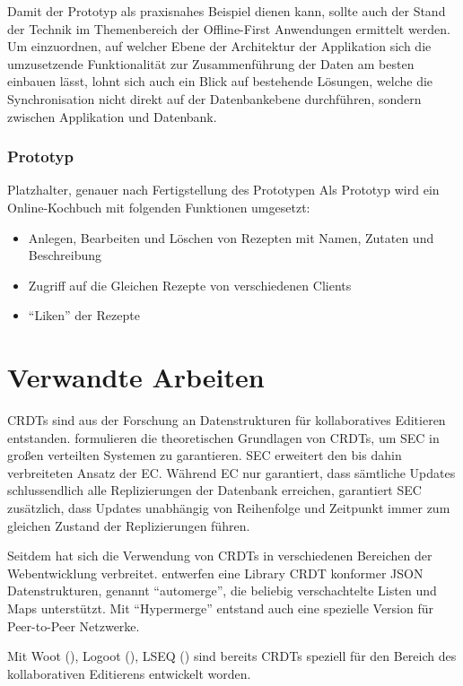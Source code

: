 \documentclass[a4paper, 12pt]{scrreprt}
\newcommand\klammercite[1]{%
	(\citealt{#1})}
\begin{document}
Damit der Prototyp als praxisnahes Beispiel dienen kann, sollte auch der Stand der Technik im Themenbereich der Offline-First Anwendungen ermittelt werden. Um einzuordnen, auf welcher Ebene der Architektur der Applikation sich die umzusetzende Funktionalität zur Zusammenführung der Daten am besten einbauen lässt, lohnt sich auch ein Blick auf bestehende Lösungen, welche die Synchronisation nicht direkt auf der Datenbankebene durchführen, sondern zwischen Applikation und Datenbank.

\subsection{Prototyp}
Platzhalter, genauer nach Fertigstellung des Prototypen
Als Prototyp wird ein Online-Kochbuch mit folgenden Funktionen umgesetzt:
\begin{itemize}
	\item Anlegen, Bearbeiten und Löschen von Rezepten mit Namen, Zutaten und Beschreibung
	\item Zugriff auf die Gleichen Rezepte von verschiedenen Clients
	\item \enquote{Liken} der Rezepte
\end{itemize}

\chapter{Verwandte Arbeiten}
\label{sec:VerwandteArbeiten}
CRDTs sind aus der Forschung an Datenstrukturen für kollaboratives Editieren entstanden. \citet{InproceedingsCRDTOriginal} formulieren die theoretischen Grundlagen von CRDTs, um \ac{SEC} in großen verteilten Systemen zu garantieren. \ac{SEC} erweitert den bis dahin verbreiteten Ansatz der \ac{EC}. Während EC nur garantiert, dass sämtliche Updates schlussendlich alle Replizierungen der Datenbank erreichen, garantiert SEC zusätzlich, dass Updates unabhängig von Reihenfolge und Zeitpunkt immer zum gleichen Zustand der Replizierungen führen.

Seitdem hat sich die Verwendung von CRDTs in verschiedenen Bereichen der Webentwicklung verbreitet. \citet{ArticleCRDTJSON} entwerfen eine Library CRDT konformer \ac{JSON} Datenstrukturen, genannt \enquote{automerge}, die beliebig verschachtelte Listen und Maps unterstützt. Mit \enquote{Hypermerge} entstand auch eine spezielle Version für Peer-to-Peer Netzwerke.

Mit Woot \klammercite{InproceedingsCRDTWoot}, Logoot \klammercite{InproceedingsCRDTLogoot}, LSEQ \klammercite{InproceedingsCRDTLSEQ} sind bereits CRDTs speziell für den Bereich des kollaborativen Editierens entwickelt worden. 
\end{document}
